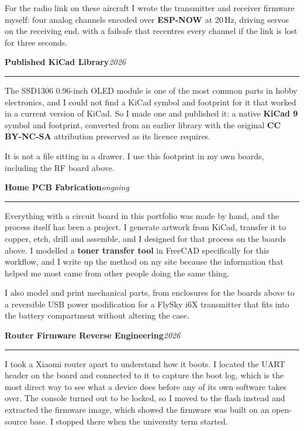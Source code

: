 \documentclass[11pt,a4paper]{article}
\newcommand{\entry}[2]{%
  \vspace{6pt}%
  {\large\bfseries #1}\hfill{\itshape\small #2}\par
  \vspace{2pt}\hrule\vspace{4pt}%
}
\begin{document}
For the radio link on these aircraft I wrote the transmitter and receiver
firmware myself: four analog channels encoded over \textbf{ESP-NOW} at 20\,Hz,
driving servos on the receiving end, with a failsafe that recentres every channel
if the link is lost for three seconds.

\entry{Published KiCad Library}{2026}

The SSD1306 0.96-inch OLED module is one of the most common parts in hobby
electronics, and I could not find a KiCad symbol and footprint for it that
worked in a current version of KiCad. So I made one and published it: a native
\textbf{KiCad 9} symbol and footprint, converted from an earlier library with
the original \textbf{CC BY-NC-SA} attribution preserved as its licence requires.

It is not a file sitting in a drawer. I use this footprint in my own boards,
including the RF board above.

\entry{Home PCB Fabrication}{ongoing}

Everything with a circuit board in this portfolio was made by hand, and the
process itself has been a project. I generate artwork from KiCad, transfer it to
copper, etch, drill and assemble, and I designed for that process on the boards
above. I modelled a \textbf{toner transfer tool} in FreeCAD specifically for
this workflow, and I write up the method on my site because the information that
helped me most came from other people doing the same thing.

I also model and print mechanical parts, from enclosures for the boards above to
a reversible USB power modification for a FlySky i6X transmitter that fits into
the battery compartment without altering the case.

\entry{Router Firmware Reverse Engineering}{2026}

I took a Xiaomi router apart to understand how it boots. I located the UART
header on the board and connected to it to capture the boot log, which is the
most direct way to see what a device does before any of its own software takes
over. The console turned out to be locked, so I moved to the flash instead and
extracted the firmware image, which showed the firmware was built on an
open-source base. I stopped there when the university term started.
\end{document}
